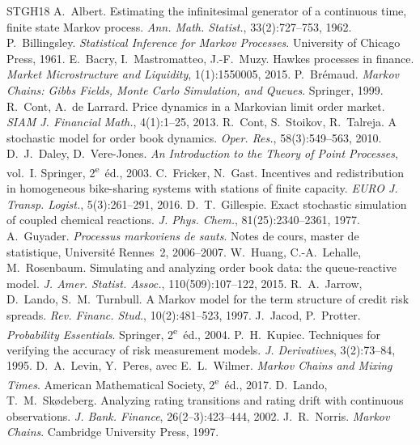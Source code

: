 \begin{thebibliography}{STGH18}
\small\sloppy\NoAutoSpacing
\setlength{\itemsep}{1pt}
 A.~Albert. Estimating the infinitesimal generator of a continuous time, finite state Markov process. \emph{Ann. Math. Statist.}, 33(2):727--753, 1962.
 P.~Billingsley. \emph{Statistical Inference for Markov Processes}. University of Chicago Press, 1961.
 E.~Bacry, I.~Mastromatteo, J.-F.~Muzy. Hawkes processes in finance. \emph{Market Microstructure and Liquidity}, 1(1):1550005, 2015.
 P.~Brémaud. \emph{Markov Chains: Gibbs Fields, Monte Carlo Simulation, and Queues}. Springer, 1999.
 R.~Cont, A.~de Larrard. Price dynamics in a Markovian limit order market. \emph{SIAM J. Financial Math.}, 4(1):1--25, 2013.
 R.~Cont, S.~Stoikov, R.~Talreja. A stochastic model for order book dynamics. \emph{Oper. Res.}, 58(3):549--563, 2010.
 D.~J.~Daley, D.~Vere-Jones. \emph{An Introduction to the Theory of Point Processes}, vol.~I. Springer, 2\textsuperscript{e}~éd., 2003.
 C.~Fricker, N.~Gast. Incentives and redistribution in homogeneous bike-sharing systems with stations of finite capacity. \emph{EURO J. Transp. Logist.}, 5(3):261--291, 2016.
 D.~T.~Gillespie. Exact stochastic simulation of coupled chemical reactions. \emph{J. Phys. Chem.}, 81(25):2340--2361, 1977.
 A.~Guyader. \emph{Processus markoviens de sauts}. Notes de cours, master de statistique, Université Rennes~2, 2006--2007.
 W.~Huang, C.-A.~Lehalle, M.~Rosenbaum. Simulating and analyzing order book data: the queue-reactive model. \emph{J. Amer. Statist. Assoc.}, 110(509):107--122, 2015.
 R.~A.~Jarrow, D.~Lando, S.~M.~Turnbull. A Markov model for the term structure of credit risk spreads. \emph{Rev. Financ. Stud.}, 10(2):481--523, 1997.
 J.~Jacod, P.~Protter. \emph{Probability Essentials}. Springer, 2\textsuperscript{e}~éd., 2004.
 P.~H.~Kupiec. Techniques for verifying the accuracy of risk measurement models. \emph{J. Derivatives}, 3(2):73--84, 1995.
 D.~A.~Levin, Y.~Peres, avec E.~L.~Wilmer. \emph{Markov Chains and Mixing Times}. American Mathematical Society, 2\textsuperscript{e}~éd., 2017.
 D.~Lando, T.~M.~Skødeberg. Analyzing rating transitions and rating drift with continuous observations. \emph{J. Bank. Finance}, 26(2--3):423--444, 2002.
 J.~R.~Norris. \emph{Markov Chains}. Cambridge University Press, 1997.

\end{thebibliography}
